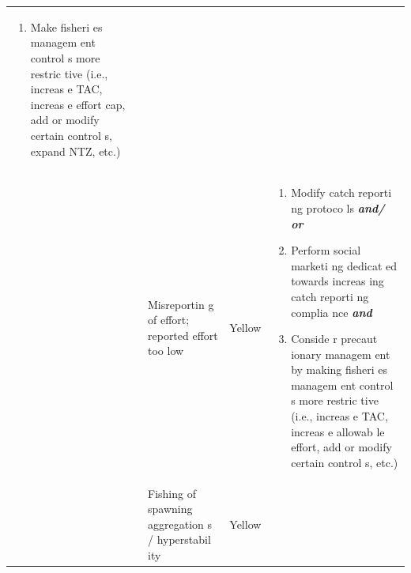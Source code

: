 \documentclass[]{book}
\providecommand{\tightlist}{%
  \setlength{\itemsep}{0pt}\setlength{\parskip}{0pt}}
\begin{document}
\begin{longtable}[]{@{}lllll@{}}
\begin{minipage}[t]{0.19\columnwidth}
\begin{enumerate}
\def\labelenumi{\arabic{enumi}.}
\tightlist
\item
  Make fisheri es managem ent control s more restric tive (i.e., increas
  e TAC, increas e effort cap, add or modify certain control s, expand
  NTZ, etc.)
\end{enumerate}\strut
\end{minipage}\tabularnewline
\begin{minipage}[t]{0.19\columnwidth}\raggedright\strut
\strut
\end{minipage} & \begin{minipage}[t]{0.19\columnwidth}\raggedright\strut
\strut
\end{minipage} & \begin{minipage}[t]{0.19\columnwidth}\raggedright\strut
Misreportin g of effort; reported effort too low\strut
\end{minipage} & \begin{minipage}[t]{0.19\columnwidth}\raggedright\strut
Yellow\strut
\end{minipage} & \begin{minipage}[t]{0.19\columnwidth}\raggedright\strut
\begin{enumerate}
\def\labelenumi{\arabic{enumi}.}
\item
  Modify catch reporti ng protoco ls \textbf{\emph{and/ or}}
\item
  Perform social marketi ng dedicat ed towards increas ing catch reporti
  ng complia nce \textbf{\emph{and} }
\item
  Conside r precaut ionary managem ent by making fisheri es managem ent
  control s more restric tive (i.e., increas e TAC, increas e allowab le
  effort, add or modify certain control s, etc.)
\end{enumerate}\strut
\end{minipage}\tabularnewline
\begin{minipage}[t]{0.19\columnwidth}\raggedright\strut
\strut
\end{minipage} & \begin{minipage}[t]{0.19\columnwidth}\raggedright\strut
\strut
\end{minipage} & \begin{minipage}[t]{0.19\columnwidth}\raggedright\strut
Fishing of spawning aggregation s / hyperstabil ity\strut
\end{minipage} & \begin{minipage}[t]{0.19\columnwidth}\raggedright\strut
Yellow\strut
\end{minipage} & \begin{minipage}[t]{0.19\columnwidth}\raggedright\strut

\end{minipage}
\end{longtable}
\end{document}
